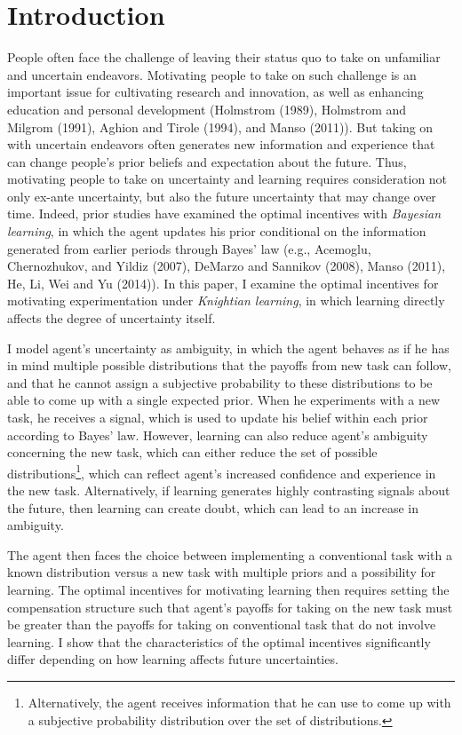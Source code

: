 \documentclass[11pt]{article} %
\theoremstyle{exampstyle}
\begin{document}
\section{Introduction}
\label{introduction}

People often face the challenge of leaving their status quo to take on unfamiliar and uncertain endeavors. Motivating people to take on such challenge is an important issue for cultivating research and innovation, as well as enhancing education and personal development (Holmstrom (1989), Holmstrom and Milgrom (1991), Aghion and Tirole (1994), and Manso (2011)). But taking on with uncertain endeavors often generates new information and experience that can change people's prior beliefs and expectation about the future. Thus, motivating people to take on uncertainty and learning requires consideration not only ex-ante uncertainty, but also the future uncertainty that may change over time. Indeed, prior studies have examined the optimal incentives with \emph{Bayesian learning}, in which the agent updates his prior conditional on the information generated from earlier periods through Bayes' law (e.g., Acemoglu, Chernozhukov, and Yildiz (2007), DeMarzo and Sannikov (2008), Manso (2011), He, Li, Wei and Yu (2014)). In this paper, I examine the optimal incentives for motivating experimentation under \emph{Knightian learning}, in which learning directly affects the degree of uncertainty itself.  

I model agent's uncertainty as ambiguity, in which the agent behaves as if he has in mind multiple possible distributions that the payoffs from new task can follow, and that he cannot assign a subjective probability to these distributions to be able to come up with a single expected prior. When he experiments with a new task, he receives a signal, which is used to update his belief within each prior according to Bayes' law. However, learning can also reduce agent's ambiguity concerning the new task, which can either reduce the set of possible distributions\footnote{Alternatively, the agent receives information that he can use to come up with a subjective probability distribution over the set of distributions.}, which can reflect agent's increased confidence and experience in the new task. Alternatively, if learning generates highly contrasting signals about the future, then learning can create doubt, which can lead to an increase in ambiguity.  

The agent then faces the choice between implementing a conventional task with a known distribution versus a new task with multiple priors and a possibility for learning. The optimal incentives for motivating learning then requires setting the compensation structure such that agent's payoffs for taking on the new task must be greater than the payoffs for taking on conventional task that do not involve learning. I show that the characteristics of the optimal incentives significantly differ depending on how learning affects future uncertainties. 
\end{document}
